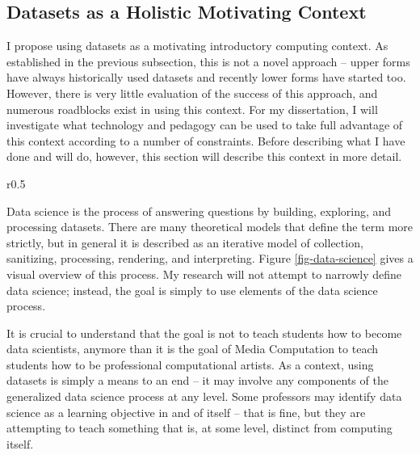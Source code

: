 \subsection{Datasets as a Holistic Motivating Context}

I propose using datasets as a motivating introductory computing context.
As established in the previous subsection, this is not a novel approach -- upper forms have always historically used datasets and recently lower forms have started too.
However, there is very little evaluation of the success of this approach, and numerous roadblocks exist in using this context.
For my dissertation, I will investigate what technology and pedagogy can be used to take full advantage of this context according to a number of constraints.
Before describing what I have done and will do, however, this section will describe this context in more detail.

\begin{wrapfigure}{r}{0.5\textwidth}
    \begin{center}
    \end{center}
    \vspace{-\bigskipamount}
    \caption{A generalized model of Data Science\protect\cite{data-science-diagram}}
    \label{fig-data-science}
\end{wrapfigure}

Data science is the process of answering questions by building, exploring, and processing datasets.
There are many theoretical models that define the term more strictly, but in general it is described as an iterative model of collection, sanitizing, processing, rendering, and interpreting.
Figure \ref{fig-data-science} gives a visual overview of this process.
My research will not attempt to narrowly define data science; instead, the goal is simply to use elements of the data science process.

It is crucial to understand that the goal is not to teach students how to become data scientists, anymore than it is the goal of Media Computation to teach students how to be professional computational artists.
As a context, using datasets is simply a means to an end -- it may involve any components of the generalized data science process at any level.
Some professors may identify data science as a learning objective in and of itself -- that is fine, but they are attempting to teach something that is, at some level, distinct from computing itself.

